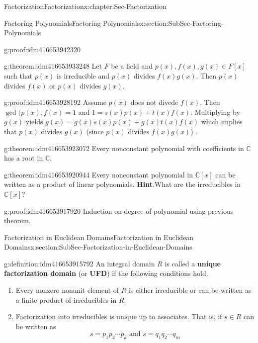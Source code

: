 \documentclass[oneside,10pt,]{book}
\newcommand{\terminology}[1]{\textbf{#1}}
\numberwithin{equation}{section}
\def\C{{\mathbb C}}
\begin{document}
\begin{chapterptx}{Factorization}{}{Factorization}{}{}{x:chapter:Sec-Factorization}
\begin{sectionptx}{Factoring Polynomials}{}{Factoring Polynomials}{}{}{x:section:SubSec-Factoring-Polynomials}
\begin{proofptx}{}{g:proof:idm416653942320}
\end{proofptx}
\begin{theorem}{}{}{g:theorem:idm416653933248}%
Let \(F\) be a field and \(p(x),f(x),g(x)\in F[x]\) such that \(p(x)\) is irreducible and \(p(x)\) divides \(f(x) g(x)\). Then \(p(x)\) divides \(f(x)\) or \(p(x)\) divides \(g(x)\).%
\end{theorem}
\begin{proofptx}{}{g:proof:idm416653928192}
Assume \(p(x)\) does not divede \(f(x)\). Then \(\gcd(p(x),f(x)=1\) and \(1=s(x)p(x)+t(x)f(x)\). Multiplying by \(g(x)\) yields \(g(x)=g(x)s(x)p(x)+g(x)t(x)f(x)\) which implies that \(p(x)\) divides \(g(x)\) (since \(p(x)\) divides \(f(x)g(x)\)) .%
\end{proofptx}
\begin{theorem}{}{}{g:theorem:idm416653923072}%
Every nonconstant polynomial with coefficients in \(\C\) has a root in \(\C\).%
\end{theorem}
\begin{theorem}{}{}{g:theorem:idm416653920944}%
Every nonconstant polynomial in \(\C[x]\) can be written as a product of linear polynomials.%
\textbf{Hint}.\quad{}What are the irreducibles in \(\C[x]\)?%
\end{theorem}
\begin{proofptx}{}{g:proof:idm416653917920}
Induction on degree of polynomial using previous theorem.%
\end{proofptx}
\end{sectionptx}
%
%
\typeout{************************************************}
\typeout{************************************************}
%
\begin{sectionptx}{Factorization in Euclidean Domains}{}{Factorization in Euclidean Domains}{}{}{x:section:SubSec-Factorization-in-Euclidean-Domains}
\begin{definition}{}{g:definition:idm416653915792}%
An integral domain \(R\) is called a \terminology{unique factorization domain} (or \terminology{UFD}) if the following conditions hold.%
\begin{enumerate}
\item{}Every nonzero nonunit element of \(R\) is either irreducible or can be written as a finite product of irreducibles in \(R\).%
\item{}Factorization into irreducibles is unique up to associates. That is, if \(s\in R\) can be written as%
\begin{equation*}
s = p_1 p_2 \cdots p_k \text{ and }  s = q_1 q_2 \cdots q_m

\end{equation*}
\end{enumerate}
\end{definition}
\end{sectionptx}
\end{chapterptx}
\end{document}
